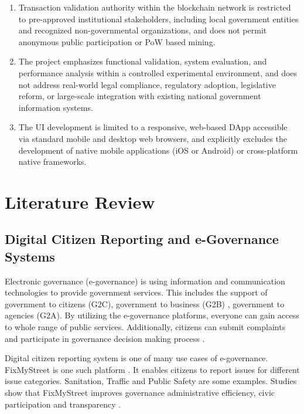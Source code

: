 \begin{enumerate}
   \item Transaction validation authority within the blockchain network is restricted to pre-approved institutional stakeholders, including local government entities and recognized non-governmental organizations, and does not permit anonymous public participation or \ac{PoW} based mining.
   

   \item The project emphasizes functional validation, system evaluation, and performance analysis within a controlled experimental environment, and does not address real-world legal compliance, regulatory adoption, legislative reform, or large-scale integration with existing national government information systems.

   \item The \ac{UI} development is limited to a responsive, web-based \ac{DApp} accessible via standard mobile and desktop web browsers, and explicitly excludes the development of native mobile applications (iOS or Android) or cross-platform native frameworks.

\end{enumerate}


\section{Literature Review}


\subsection{Digital Citizen Reporting and e-Governance Systems}

Electronic governance (e-governance) is using information and communication technologies to provide government services. This includes the support of government to citizens (G2C), government to business (G2B) , government to agencies (G2A). By utilizing the e-governance platforms, everyone can gain access to whole range of public services. Additionally, citizens can submit complaints and participate in governance decision making process \cite{goyal_egovernance_2021}.

Digital citizen reporting system is one of many use cases of e-governance. FixMyStreet is one such platform \cite{Matthews2018}. It enables citizens to report issues for different issue categories. Sanitation, Traffic and Public Safety are some examples. Studies show that FixMyStreet improves governance administrative efficiency, civic participation and  transparency \cite{oliveira2020smartcities}.

